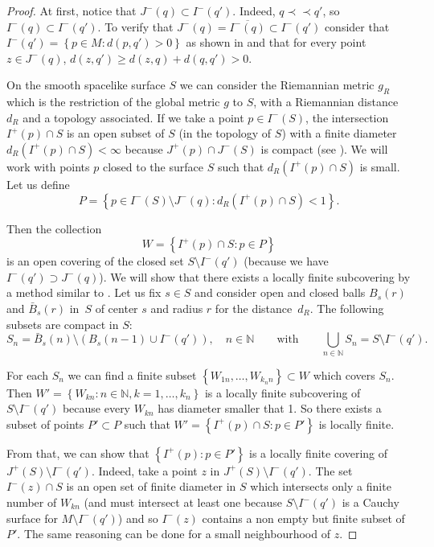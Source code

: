 \documentclass[11pt]{article}
\newcommand{\set}[1]{\left\{ {#1} \right\}}
\newcommand{\parenthese}[1]{\left( {#1} \right)}
\newcommand{\setN}{{\mathbb N}}
\newcommand{\precc}{\prec\!\!\prec}
\begin{document}
\begin{proof}
At f\/irst, notice that $J^-(q) \subset  I^-(q')$. Indeed, $q \precc q'$, so $I^-(q) \subset  I^-(q')$. To verify that $J^-(q) = \overline{I^-(q) }\subset  I^-(q')$ consider that $I^-(q') = \set{ p\in M : d(p,q') > 0}$ as shown in \cite{Beem} and that for every point $ z\in J^-(q)$, $d(z,q') \geq d(z,q) + d(q,q') > 0$.

On the smooth spacelike surface $S$ we can consider the Riemannian metric $g_R$ which is the restriction of the global metric $g$ to $S$, with a Riemannian distance $d_R$ and a topology associated. If we take a point $p \in I^-(S)$, the intersection $I^+(p) \cap S$ is an open subset of $S$ (in the topology of $S$) with a f\/inite diameter $d_R(I^+(p) \cap S) < \infty $  because $J^+(p) \cap J^-(S)$ is compact (see \cite{Wald}). We will work with points $p$ closed to the surface $S$ such that $d_R(I^+(p) \cap S)$ is small. Let us def\/ine
\[
P = \set{ p \in I^-(S) \setminus J^-(q) : d_R(I^+(p) \cap S) < 1}.
\]

Then the collection
\[
W = \set{ I^+(p) \cap S : p \in P}
\]
is an open covering of the closed set $S \setminus I^-(q')$ (because we have $I^-(q') \supset J^-(q)$). We will show that there exists a locally f\/inite subcovering by a method similar to \cite{BS03}. Let us f\/ix $s \in S$ and consider open and closed balls $B_s(r)$ and $\bar B_s(r)$ in~$S$ of center $s$ and radius $r$ for the distance~$d_R$. The following subsets are compact in $S$:
\[
S_n = \bar B_s(n) \setminus \parenthese{ B_s(n-1) \cup I^-(q')}, \quad n \in \setN \qquad \text{with} \qquad \bigcup_{n\in \setN} S_n = S \setminus I^-(q').
\]

For each $S_n$ we can f\/ind a f\/inite subset $\set{W_{1n}, \dots, W_{k_n n}} \subset W$ which covers $S_n$. Then $W' = \set{W_{kn} : n\in \setN , k = 1, \dots, k_n}$ is a locally f\/inite subcovering of $S \setminus I^-(q')$ because every $W_{kn}$ has diameter smaller that 1. So there exists a subset of points $P' \subset P$ such that $W' = \set{ I^+(p) \cap S : p \in P'}$ is locally f\/inite.

From that, we can show that $\set{I^+(p) : p \in P'}$ is a locally f\/inite covering of  $J^+(S) \setminus I^-(q')$. Indeed, take a point $z$ in $J^+(S) \setminus I^-(q')$. The set $I^-(z) \cap S$ is an open set of f\/inite diameter in $S$ which intersects only a f\/inite number of $W_{kn}$ (and must intersect at least one because $S \setminus I^-(q')$ is a Cauchy surface for $M \setminus I^-(q')$) and so $I^-(z)$ contains a non empty but f\/inite subset of $P'$. The same reasoning can be done for a small neighbourhood of $z$.


\end{proof}
\end{document}
